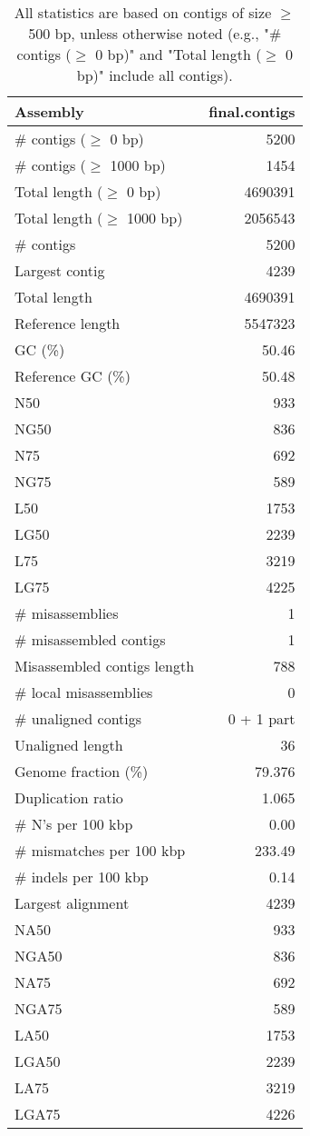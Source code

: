\documentclass[12pt,a4paper]{article}
\begin{document}
\begin{table}[ht]
\begin{center}
\caption{All statistics are based on contigs of size $\geq$ 500 bp, unless otherwise noted (e.g., "\# contigs ($\geq$ 0 bp)" and "Total length ($\geq$ 0 bp)" include all contigs).}
\begin{tabular}{|l*{1}{|r}|}
\hline
Assembly & final.contigs \\ \hline
\# contigs ($\geq$ 0 bp) & 5200 \\ \hline
\# contigs ($\geq$ 1000 bp) & 1454 \\ \hline
Total length ($\geq$ 0 bp) & 4690391 \\ \hline
Total length ($\geq$ 1000 bp) & 2056543 \\ \hline
\# contigs & 5200 \\ \hline
Largest contig & 4239 \\ \hline
Total length & 4690391 \\ \hline
Reference length & 5547323 \\ \hline
GC (\%) & 50.46 \\ \hline
Reference GC (\%) & 50.48 \\ \hline
N50 & 933 \\ \hline
NG50 & 836 \\ \hline
N75 & 692 \\ \hline
NG75 & 589 \\ \hline
L50 & 1753 \\ \hline
LG50 & 2239 \\ \hline
L75 & 3219 \\ \hline
LG75 & 4225 \\ \hline
\# misassemblies & 1 \\ \hline
\# misassembled contigs & 1 \\ \hline
Misassembled contigs length & 788 \\ \hline
\# local misassemblies & 0 \\ \hline
\# unaligned contigs & 0 + 1 part \\ \hline
Unaligned length & 36 \\ \hline
Genome fraction (\%) & 79.376 \\ \hline
Duplication ratio & 1.065 \\ \hline
\# N's per 100 kbp & 0.00 \\ \hline
\# mismatches per 100 kbp & 233.49 \\ \hline
\# indels per 100 kbp & 0.14 \\ \hline
Largest alignment & 4239 \\ \hline
NA50 & 933 \\ \hline
NGA50 & 836 \\ \hline
NA75 & 692 \\ \hline
NGA75 & 589 \\ \hline
LA50 & 1753 \\ \hline
LGA50 & 2239 \\ \hline
LA75 & 3219 \\ \hline
LGA75 & 4226 \\ \hline
\end{tabular}
\end{center}
\end{table}
\end{document}
